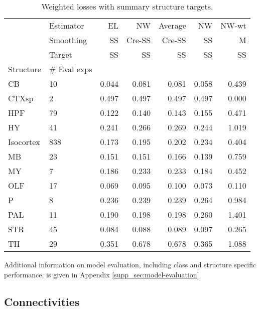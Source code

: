 \begin{table}[H]
\scriptsize

\begin{tabular}{ll|rrrrr}
\toprule
   & Estimator &     EL &     NW & Average &     NW &  NW-wt \\
   & Smoothing &     SS & Cre-SS &  Cre-SS &     SS &      M \\
   & Target &     SS &     SS &      SS &     SS &     SS \\
Structure & \# Eval exps &        &        &         &        &        \\
\midrule
\hline
CB & 10 &  0.044 &  0.081 &   0.081 &  0.058 &  0.439 \\
CTXsp & 2 &  0.497 &  0.497 &   0.497 &  0.497 &  0.000 \\
HPF & 79 &  0.122 &  0.140 &   0.143 &  0.155 &  0.471 \\
HY & 41 &  0.241 &  0.266 &   0.269 &  0.244 &  1.019 \\
Isocortex & 838 &  0.173 &  0.195 &   0.202 &  0.234 &  0.404 \\
MB & 23 &  0.151 &  0.151 &   0.166 &  0.139 &  0.759 \\
MY & 7 &  0.186 &  0.233 &   0.233 &  0.184 &  0.452 \\
OLF & 17 &  0.069 &  0.095 &   0.100 &  0.073 &  0.110 \\
P & 8 &  0.236 &  0.239 &   0.239 &  0.264 &  0.984 \\
PAL & 11 &  0.190 &  0.198 &   0.198 &  0.260 &  1.401 \\
STR & 45 &  0.084 &  0.088 &   0.089 &  0.097 &  0.265 \\
TH & 29 &  0.351 &  0.678 &   0.678 &  0.365 &  1.088 \\
\bottomrule
\end{tabular}
\caption{Weighted losses with summary structure targets.}
\label{tab:loss}
\end{table}

Additional information on model evaluation, including class and structure specific performance, is given in Appendix \ref{supp_sec:model-evaluation}

\newpage

\subsection{Connectivities}

